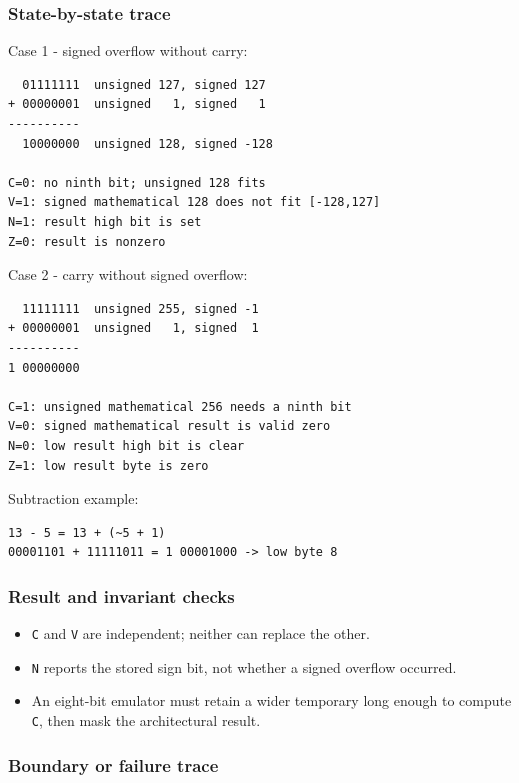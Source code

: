 \subsubsection{State-by-state trace}\label{appendix-92ff77d4dfdc-state-by-state-trace-1}

Case 1 - signed overflow without carry:

\begin{verbatim}
  01111111  unsigned 127, signed 127
+ 00000001  unsigned   1, signed   1
----------
  10000000  unsigned 128, signed -128

C=0: no ninth bit; unsigned 128 fits
V=1: signed mathematical 128 does not fit [-128,127]
N=1: result high bit is set
Z=0: result is nonzero
\end{verbatim}

Case 2 - carry without signed overflow:

\begin{verbatim}
  11111111  unsigned 255, signed -1
+ 00000001  unsigned   1, signed  1
----------
1 00000000

C=1: unsigned mathematical 256 needs a ninth bit
V=0: signed mathematical result is valid zero
N=0: low result high bit is clear
Z=1: low result byte is zero
\end{verbatim}

Subtraction example:

\begin{verbatim}
13 - 5 = 13 + (~5 + 1)
00001101 + 11111011 = 1 00001000 -> low byte 8
\end{verbatim}

\subsubsection{Result and invariant checks}\label{appendix-92ff77d4dfdc-result-and-invariant-checks-1}

\begin{itemize}
\tightlist
\item
  \texttt{C} and \texttt{V} are independent; neither can replace the other.
\item
  \texttt{N} reports the stored sign bit, not whether a signed overflow occurred.
\item
  An eight-bit emulator must retain a wider temporary long enough to compute \texttt{C}, then mask the architectural result.
\end{itemize}

\subsubsection{Boundary or failure trace}\label{appendix-92ff77d4dfdc-boundary-or-failure-trace-1}

